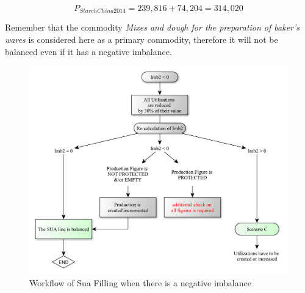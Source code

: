 \documentclass[]{article}
\begin{document}
\begin{equation}
\label{eq:prod}
P_{StarchChina2014} = 239,816 + 74,204 = 314,020
\end{equation}

Remember that the commodity \emph{Mixes and dough for the preparation of
baker's wares} is considered here as a primary commodity, therefore it
will not be balanced even if it has a negative imbalance.

\begin{figure}

{\centering \includegraphics{images/06_NegativeImbalance} 

}

\caption{\label{fig:f5}Workflow of Sua Filling when there is a negative imbalance}\label{fig:f6}
\end{figure}
\end{document}
